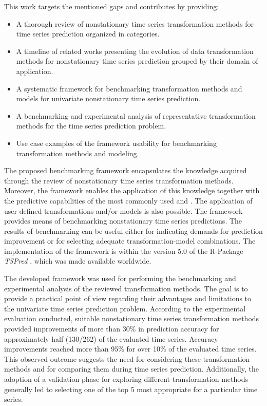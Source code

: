 \documentclass[11pt]{dippg}
\begin{document}
This work targets the mentioned gaps and contributes by providing:
\begin{itemize}
	\item A thorough review of nonstationary time series transformation methods for time series prediction organized in categories.
	\item A timeline of related works presenting the evolution of data transformation methods for nonstationary time series prediction grouped by their domain of application.
	\item A systematic framework for benchmarking transformation methods and models for univariate nonstationary time series prediction.
	\item A benchmarking and experimental analysis of representative transformation methods for the time series prediction problem.
	\item Use case examples of the framework usability for benchmarking transformation methods and  modeling.
\end{itemize}

The proposed benchmarking framework encapsulates the knowledge acquired through the review of nonstationary time series transformation methods. Moreover, the framework enables the application of this knowledge together with the predictive capabilities of the most commonly used  and . The application of user-defined transformations and/or models is also possible. The framework provides means of benchmarking nonstationary time series predictions. The results of benchmarking can be useful either for indicating demands for prediction improvement or for selecting adequate transformation-model combinations. The implementation of the framework is within the version 5.0 of the R-Package \emph{TSPred} \cite{salles_tspred:_2018}, which was made available worldwide.

The developed framework was used for performing the benchmarking and experimental analysis of the reviewed transformation methods. The goal is to provide a practical point of view regarding their advantages and limitations to the univariate time series prediction problem. According to the experimental evaluation conducted, suitable nonstationary time series transformation methods provided improvements of more than 30\% in prediction accuracy for approximately half (130/262) of the evaluated time series. Accuracy improvements reached more than 95\% for over 10\% of the evaluated time series. This observed outcome suggests the need for considering these transformation methods and for comparing them during time series prediction. Additionally, the adoption of a validation phase for exploring different transformation methods generally led to selecting one of the top 5 most appropriate for a particular time series.
\end{document}
